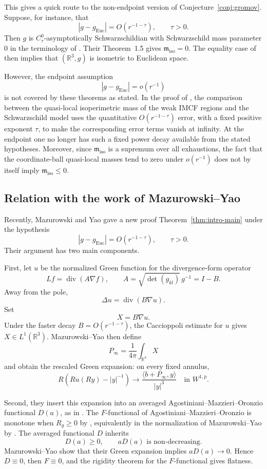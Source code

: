 \documentclass[11pt]{amsart}
\numberwithin{equation}{section}
\theoremstyle{definition}
\newcommand{\R}{\mathbb R}
\newcommand{\Euc}{\mathrm{Euc}}
\newcommand{\divE}{\operatorname{div}}
\begin{document}
This gives a quick route to the non-endpoint version of Conjecture~\ref{conj:gromov}.  Suppose, for instance, that
$$
        |g-g_{\Euc}|=O(r^{-1-\tau}),\qquad \tau>0.
$$
Then $g$ is $C^0_\tau$-asymptotically Schwarzschildian with Schwarzschild mass parameter $0$ in the terminology of \cite{BFM}.  Their Theorem~1.5 gives
$
        \mathfrak m_{\mathrm{iso}}=0.
$
The equality case of  \cite[Theorem~2.14]{BFM} then implies that $(\R^3,g)$ is isometric to Euclidean space. 


However, the endpoint assumption $$ |g-g_{\mathrm{Euc}}|=o(r^{-1}) $$ is not covered
by these theorems as stated.  In the proof of \cite[Theorem~1.5]{BFM}, the
comparison between the quasi-local isoperimetric mass of the weak IMCF
regions and the Schwarzschild model uses the quantitative
\(O(r^{-1-\tau})\) error, with a fixed positive exponent \(\tau\), to make
the corresponding error terms vanish at infinity.  At the endpoint one no
longer has such a fixed power decay available from the stated hypotheses.
Moreover, since $\mathfrak m_{\mathrm{iso}}$ is a supremum over all
exhaustions, the fact that the coordinate-ball quasi-local masses tend to
zero under \(o(r^{-1})\) does not by itself imply
\(\mathfrak m_{\mathrm{iso}}\le0\).


\subsection{Relation with the work of Mazurowski--Yao}
Recently, Mazurowski and Yao \cite{MYrigidity} gave a new proof Theorem~\ref{thm:intro-main} under the hypothesis
$$
        |g-g_{\Euc}|=O(r^{-1-\tau}),\qquad \tau>0.
$$
Their argument has two main components.

First, let $u$ be the normalized Green function for the divergence-form operator
$$
        Lf=\divE(A\nabla f),\qquad A=\sqrt{\det(g_{kl})}\,g^{-1}=I-B.
$$
Away from the pole,
$$
        \Delta u=\divE(B\nabla u).
$$
Set
$$
        X=B\nabla u.
$$
Under the faster decay $B=O(r^{-1-\tau})$, the Caccioppoli estimate for $u$ gives $X\in L^1(\R^3)$.  Mazurowski--Yao then define 
$$
        P_\infty=\frac1{4\pi}\int_{\R^3}X
$$
and obtain the rescaled Green expansion: on every fixed annulus,
$$
        R\left(Ru(Ry)-|y|^{-1}\right)
        \longrightarrow \frac{\langle b+P_\infty,y\rangle}{|y|^3}
        \quad\text{in } W^{1,p}.
$$

Second, they insert this expansion into an averaged Agostiniani--Mazzieri--Oronzio functional $D(a)$, as in \cite[Section~3.1]{MYrigidity}.  The $F$-functional of Agostiniani--Mazzieri--Oronzio is monotone when $R_g\ge0$ by \cite[Theorem~1.1]{AMO}, equivalently in the normalization of Mazurowski--Yao by \cite[Appendix~A, Proposition~22]{MYrigidity}.  The averaged functional $D$ inherits
$$
        D(a)\ge0,
        \qquad aD(a)\text{ is non-decreasing}.
$$
Mazurowski--Yao show that their Green expansion implies $aD(a)\to0$.  Hence $D\equiv0$, then $F\equiv0$, and the rigidity theorem for the $F$-functional gives flatness.
\end{document}
